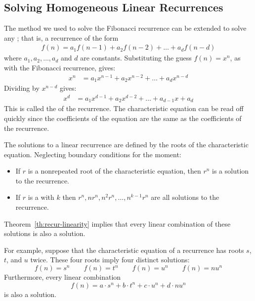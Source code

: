 \subsection{Solving Homogeneous Linear Recurrences}

The method we used to solve the Fibonacci recurrence can be extended
to solve any ; that is, a recurrence of
the form
\begin{align*}
f(n) = a_1 f(n-1) + a_2 f(n-2) + \ldots + a_d f(n - d)
\end{align*}
where $a_1, a_2, \ldots, a_d$ and $d$ are constants.  Substituting the
guess $f(n) = x^n$, as with the Fibonacci recurrence, gives:
\begin{align*}
x^n & =a_1x^{n-1} +a_2x^{n-2} + \ldots +a_dx^{n-d}
\end{align*}
Dividing by $x^{n-d}$ gives:
\begin{align*}
x^d & = a_1x^{d-1} + a_2x^{d-2} + \ldots+a_{d-1}x+a_d
\end{align*}
This is called the  of the
recurrence. The characteristic equation can be read off quickly
since the coefficients of the equation are the same as the
coefficients of the recurrence.

The solutions to a linear recurrence are defined by the roots of the
characteristic equation. Neglecting boundary conditions for the
moment:
\begin{itemize}
\item If $r$ is a nonrepeated root of the characteristic equation,
  then $r^n$ is a solution to the recurrence.
\item If $r$ is a  with  $k$ then $r^n,
  nr^n, n^2r^n, \ldots, n^{k-1}r^n$ are all solutions to the
  recurrence.
\end{itemize}
Theorem~\ref{th:recur-linearity} implies that every linear
  combination of these solutions is also a solution.

For example, suppose that the characteristic equation of a
recurrence has roots $s$, $t$, and $u$ twice. These four roots
imply four distinct solutions:
\[
f(n) = s^n \qquad f(n) = t^n \qquad f(n) = u^n \qquad f(n)
  = nu^n
\]
Furthermore, every linear combination
\begin{equation}
f(n) = a \cdot s^n + b \cdot t^n + c \cdot u^n +d \cdot nu^n
\end{equation}
is also a solution.

